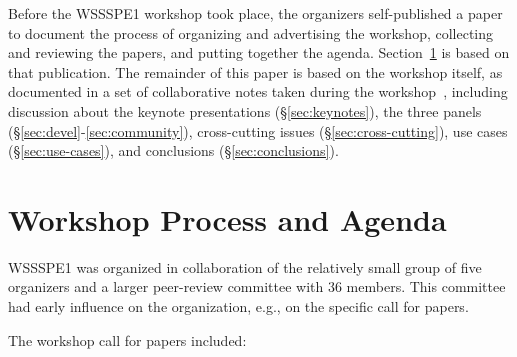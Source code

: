 \documentclass[11pt, oneside]{amsart}
\begin{document}
Before the WSSSPE1 workshop took place, the organizers self-published
a paper~\cite{WSSSPE1-pre-report} to document the process of
organizing and advertising the workshop, collecting and reviewing the
papers, and putting together the agenda. Section~\ref{sec:process} is
based on that publication. The remainder of this paper is based on the
workshop itself, as documented in a set of collaborative notes taken
during the workshop~\cite{WSSSPE1-google-notes}, including discussion
about the keynote presentations (\S\ref{sec:keynotes}), the three
panels (\S\ref{sec:devel}-\ref{sec:community}), 
cross-cutting issues (\S\ref{sec:cross-cutting}),
use cases (\S\ref{sec:use-cases}), and conclusions
(\S\ref{sec:conclusions}).

\section{Workshop Process and Agenda} \label{sec:process}

WSSSPE1 was organized in collaboration of the relatively small group
of five organizers and a larger peer-review committee with 36
members. This committee had early influence on the organization, e.g.,
on the specific call for papers.

The workshop call for papers included:
\end{document}
